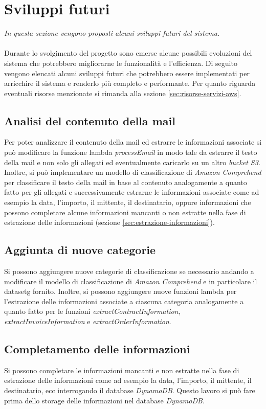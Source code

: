 \chapter{Sviluppi futuri}
\label{cap:sviluppi-futuri}
\emph{In questa sezione vengono proposti alcuni sviluppi futuri del sistema.}\\\\
Durante lo svolgimento del progetto sono emerse alcune possibili evoluzioni del sistema che potrebbero migliorarne le funzionalità e l'efficienza. Di seguito vengono elencati alcuni sviluppi futuri che potrebbero essere implementati per arricchire il sistema e renderlo più completo e performante. Per quanto riguarda eventuali risorse menzionate si rimanda alla sezione \ref{sec:risorse-servizi-aws}.
\section{Analisi del contenuto della mail}
Per poter analizzare il contenuto della mail ed estrarre le informazioni associate si può modificare la funzione lambda \textit{processEmail} in modo tale da estrarre il testo della mail e non solo gli allegati ed eventualmente caricarlo su un altro \emph{bucket S3}.\\
Inoltre, si può implementare un modello di classificazione di \emph{Amazon Comprehend} per classificare il testo della mail in base al contenuto analogamente a quanto fatto per gli allegati e successivamente estrarne le informazioni associate come ad esempio la data, l'importo, il mittente, il destinatario, oppure informazioni che possono completare alcune informazioni mancanti o non estratte nella fase di estrazione delle informazioni (sezione \ref{sec:estrazione-informazioni}).
\section{Aggiunta di nuove categorie}
Si possono aggiungere nuove categorie di classificazione se necessario andando a modificare il modello di classificazione di \emph{Amazon Comprehend} e in particolare il \gls{datasetg} fornito. Inoltre, si possono aggiungere nuove funzioni lambda per l'estrazione delle informazioni associate a ciascuna categoria analogamente a quanto fatto per le funzioni \textit{extractContractInformation}, \textit{extractInvoiceInformation} e \textit{extractOrderInformation}.
\section{Completamento delle informazioni}
Si possono completare le informazioni mancanti e non estratte nella fase di estrazione delle informazioni come ad esempio la data, l'importo, il mittente, il destinatario, ecc interrogando il database \emph{DynamoDB}. Questo lavoro si può fare prima dello storage delle informazioni nel database \emph{DynamoDB}.
